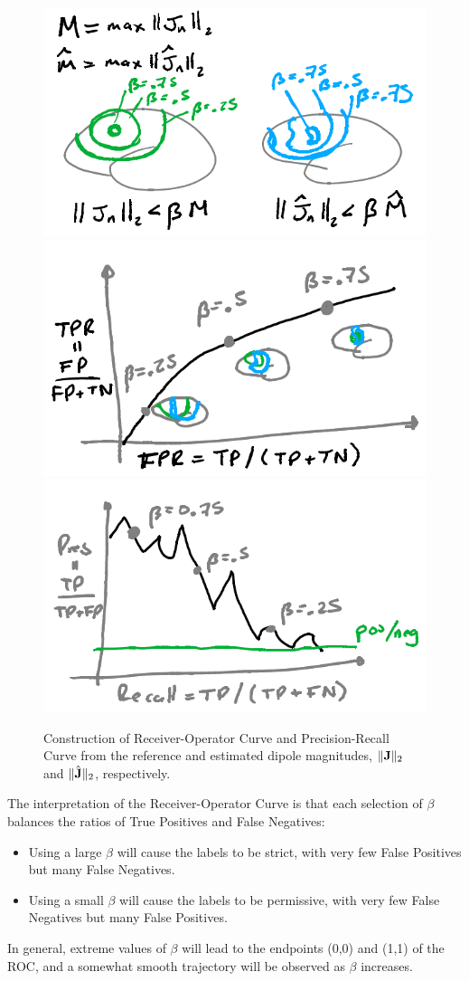 \begin{figure}
\centering
\includegraphics[width=0.8\linewidth]{./img_dev/nsCurves1}
%
\includegraphics[width=0.4\linewidth]{./img_dev/nsCurves2}
\includegraphics[width=0.4\linewidth]{./img_dev/nsCurves3}
\caption{Construction of Receiver-Operator Curve and Precision-Recall Curve from the reference and estimated dipole magnitudes, $\lVert {\mathbf{J}} \rVert_2$ and $\lVert \hat{\mathbf{J}} \rVert_2$, respectively.}
\end{figure}

The interpretation of the Receiver-Operator Curve is that each selection of $\beta$ balances the ratios of True Positives and False Negatives:
\begin{itemize}
\item 
Using a large $\beta$ will cause the labels to be strict, with very few False Positives but many False Negatives.
\item
Using a small $\beta$ will cause the labels to be permissive, with very few False Negatives but many False Positives.
\end{itemize}
In general, extreme values of $\beta$ will lead to the endpoints (0,0) and (1,1) of the ROC, and a somewhat smooth trajectory will be observed as $\beta$ increases.

